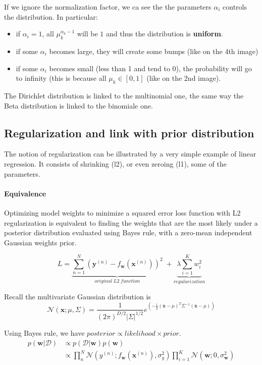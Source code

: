 If we ignore the normalization factor, we ca see the the parameters $\alpha_i$ controls the distribution. In particular:
\begin{itemize}
    \item if $\alpha_i = 1$, all $\mu_k^{\alpha_k-1}$ will be $1$ and thus the distribution is \textbf{uniform}.
    \item if some $\alpha_i$ becomes large, they will create some bumps (like on the 4th image)
    \item if some $\alpha_i$ becomes small (less than 1 and tend to 0), the probability will go to infinity (this is because all $\mu_k \in [0, 1]$ (like on the 2nd image).
\end{itemize}


The Dirichlet distribution is linked to the multinomial one, the same way the Beta distribution is linked to the binomiale one.


\subsection{Regularization and link with prior distribution}
The notion of regularization can be illustrated by a very simple example of linear regression. It consists of shrinking (l2), or even zeroing (l1), some of the parameters.

\paragraph{Equivalence}
Optimizing model weights to minimize a squared error loss function with L2 regularization is equivalent to finding the weights that are the most likely under a posterior distribution evaluated using Bayes rule, with a zero-mean independent Gaussian weights prior.

\begin{equation}
L = \underbrace{\sum_{n=1}^N (\mathbf{y}^{(n)}-f_\mathbf{w}(\mathbf{x}^{(n)}))^2}_{original\;L2\;function} \;+ \underbrace{\lambda \sum_{i=1}^{K} w_i^2}_{regularization}
\end{equation}

Recall the multivariate Gaussian distribution is
\begin{equation}
    \mathcal{N}(\mathbf{x}; \mu, \Sigma) = \frac{1}{(2\pi)^{D/2} |\Sigma|^{1/2}} e^{\left(-\frac{1}{2} (\mathbf{x}-\mu)^T \Sigma^{-1}(\mathbf{x}-\mu)\right)}
\end{equation}

Using Bayes rule, we have $posterior \propto likelihood \times prior$.
\begin{align}
    p(\mathbf{w}|\mathcal{D}) & \propto p(\mathcal{D}|\mathbf{w}) p(\mathbf{w}) \\
     & \propto \prod_n^N \mathcal{N}(y^{(n)}; f_\mathbf{w}(\mathbf{x}^{(n)}), \sigma_y^2) \prod_{i=1}^K \mathcal{N}(\mathbf{w}; 0, \sigma_\mathbf{w}^2)
\end{align}

